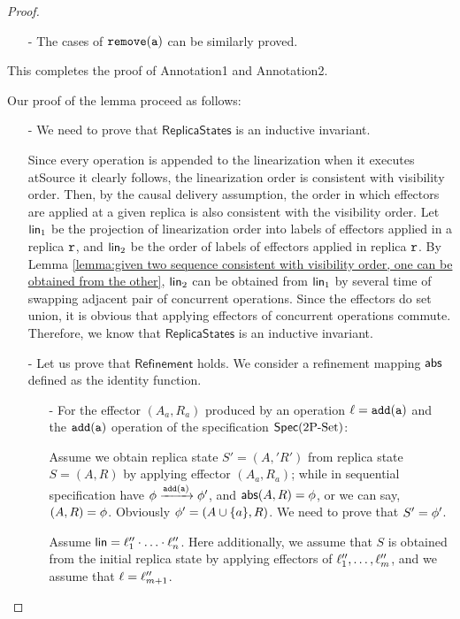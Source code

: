 \begin {proof}
\begin{itemize}
\item[-] The cases of $\alabelshort[{\tt remove}]{a}$ can be similarly proved.
\end{itemize}

This completes the proof of Annotation1 and Annotation2.

Our proof of the lemma proceed as follows:

\begin{itemize}
\setlength{\itemsep}{0.5pt}
\item[-] We need to prove that $\mathsf{ReplicaStates}$ is an inductive invariant.

Since every operation is appended to the linearization when it executes atSource it clearly follows, the linearization order is consistent with visibility order. Then, by the causal delivery assumption, the order in which effectors are applied at a given replica is also consistent with the visibility order. Let $\mathsf{lin}_1$ be the projection of linearization order into labels of effectors applied in a replica $\mathtt{r}$, and $\mathsf{lin}_2$ be the order of labels of effectors applied in replica $\mathtt{r}$. By Lemma \ref{lemma:given two sequence consistent with visibility order, one can be obtained from the other}, $\mathsf{lin}_2$ can be obtained from $\mathsf{lin}_1$ by several time of swapping adjacent pair of concurrent operations. Since the effectors do set union, it is obvious that applying effectors of concurrent operations commute. Therefore, we know that $\mathsf{ReplicaStates}$ is an inductive invariant.

\item[-] Let us prove that $\mathsf{Refinement}$ holds. We consider a refinement mapping $\mathsf{abs}$ defined as the identity function.

    \begin{itemize}
    \setlength{\itemsep}{0.5pt}
    \item[-] For the effector $(A_a,R_a)$ produced by an operation $\alabel = \alabelshort[{\tt add}]{a}$ and the $\alabelshort[{\tt add}]{a}$ operation of the specification $\mathsf{Spec}(\text{2P\text{-}Set})$:

    Assume we obtain replica state $S' = (A,'R')$ from replica state $S = (A,R)$ by applying effector $(A_a,R_a)$; while in sequential specification have $\abstate \xrightarrow{\alabelshort[{\tt add}]{a}} \abstate'$, and $\mathsf{abs}(A,R) = \phi$, or we can say, $(A,R) = \phi$. Obviously $\phi' = (A \cup \{ a \},R)$. We need to prove that $S' = \phi'$.

    Assume $\mathsf{lin} = \ell''_1 \cdot \ldots \cdot \ell''_n$. Here additionally, we assume that $S$ is obtained from the initial replica state by applying effectors of $\ell''_1,\ldots,\ell''_m$, and we assume that $\ell = \ell''_{m+1}$.


\end{itemize}
\end{itemize}
\end{proof}
